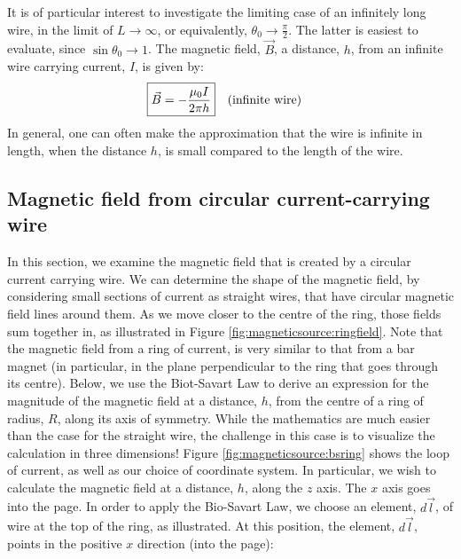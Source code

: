 It is of particular interest to investigate the limiting case of an infinitely long wire, in the limit of $L\to\infty$, or equivalently, $\theta_0\to\frac{\pi}{2}$. The latter is easiest to evaluate, since $\sin\theta_0\to 1$. The magnetic field, $\vec B$, a distance, $h$, from an infinite wire carrying current, $I$, is given by:
\begin{align*}
\Aboxed{\vec B &= -\frac{\mu_0 I}{2\pi h}}\quad\text{(infinite wire)}
\end{align*}
In general, one can often make the approximation that the wire is infinite in length, when the distance $h$, is small compared to the length of the wire. 
\subsection{Magnetic field from circular current-carrying wire}
In this section, we examine the magnetic field that is created by a circular current carrying wire. We can determine the shape of the magnetic field, by considering small sections of current as straight wires, that have circular magnetic field lines around them. As we move closer to the centre of the ring, those fields sum together in, as illustrated in Figure \ref{fig:magneticsource:ringfield}. Note that the magnetic field from a ring of current, is very similar to that from a bar magnet (in particular, in the plane perpendicular to the ring that goes through its centre).   
Below, we use the Biot-Savart Law to derive an expression for the magnitude of the magnetic field at a distance, $h$, from the centre of a ring of radius, $R$, along its axis of symmetry. While the mathematics are much easier than the case for the straight wire, the challenge in this case is to visualize the calculation in three dimensions! Figure \ref{fig:magneticsource:bsring} shows the loop of current, as well as our choice of coordinate system. In particular, we wish to calculate the magnetic field at a distance, $h$, along the $z$ axis. The $x$ axis goes into the page. 
In order to apply the Bio-Savart Law, we choose an element, $d\vec l$, of wire at the top of the ring, as illustrated. At this position, the element, $d\vec l$, points in the positive $x$ direction (into the page):
